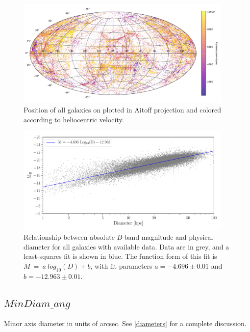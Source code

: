 \documentclass[iop]{emulateapj-rtx4}
\begin{document}
\begin{figure}[ht!]
        \centering
        \vspace{0pt}
        \includegraphics[width=0.95\textwidth]{all_sky.pdf}
        \caption{\small{Position of all galaxies on plotted in Aitoff projection and colored according to heliocentric velocity.}}
        \label{allskyvhel}
\end{figure}


\begin{figure}[ht!]
        \centering
        \vspace{0pt}
        \includegraphics[width=0.95\textwidth]{mag_v_diam_fit.pdf}
        \caption{\small{Relationship between absolute $B$-band magnitude and physical diameter for all galaxies with available data. Data are in grey, and a least-squares fit is shown in blue. The function form of this fit is $M ~=~ a ~ log_{10}(D) + b$, with fit parameters $a = -4.696 \pm 0.01$ and $b = -12.963 \pm 0.01$. }}
        \label{magvdiam}
\end{figure}


\subsection{$MinDiam\_ang$}
Minor axis diameter in units of arcsec. See \ref{diameters} for a complete discussion.
\end{document}
